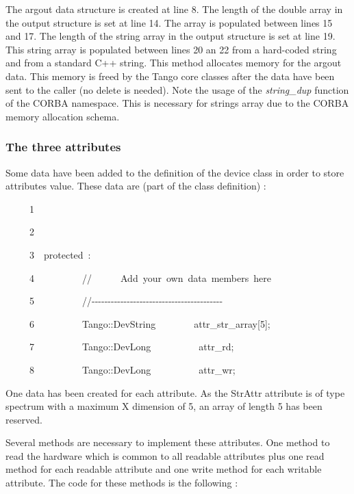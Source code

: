 The argout data structure is created at line 8. The length of the
double array in the output structure is set at line 14. The array
is populated between lines 15 and 17. The length of the string array
in the output structure is set at line 19. This string array is populated
between lines 20 an 22 from a hard-coded string and from a standard
C++ string. This method allocates memory for the argout
data. This memory is freed by the Tango core classes after the data
have been sent to the caller (no delete is needed). Note the usage
of the \emph{string\_dup} function of the CORBA
namespace. This is necessary for strings array due to the CORBA memory
allocation schema.

\subsubsection{The three attributes}

Some data have been added to the definition of the device class in
order to store attributes value. These data are (part of the class
definition) :


\begin{lyxcode}
~~~~~1~~

~~~~~2~~

~~~~~3~~protected~:~~~~~

~~~~~4~~~~~~~~~~//~~~~~~Add~your~own~data~members~here

~~~~~5~~~~~~~~~~//-{}-{}-{}-{}-{}-{}-{}-{}-{}-{}-{}-{}-{}-{}-{}-{}-{}-{}-{}-{}-{}-{}-{}-{}-{}-{}-{}-{}-{}-{}-{}-{}-{}-{}-{}-{}-{}-{}-{}-{}-

~~~~~6~~~~~~~~~~Tango::DevString~~~~~~~~attr\_str\_array{[}5{]};

~~~~~7~~~~~~~~~~Tango::DevLong~~~~~~~~~~attr\_rd;

~~~~~8~~~~~~~~~~Tango::DevLong~~~~~~~~~~attr\_wr;
\end{lyxcode}


One data has been created for each attribute. As the StrAttr attribute
is of type spectrum with a maximum X dimension of 5, an array of length
5 has been reserved.

Several methods are necessary to implement these attributes. One method
to read the hardware which is common to all \textquotedbl{}readable\textquotedbl{}
attributes plus one \textquotedbl{}read\textquotedbl{} method for
each readable attribute and one \textquotedbl{}write\textquotedbl{}
method for each writable attribute. The code for these methods is
the following :

